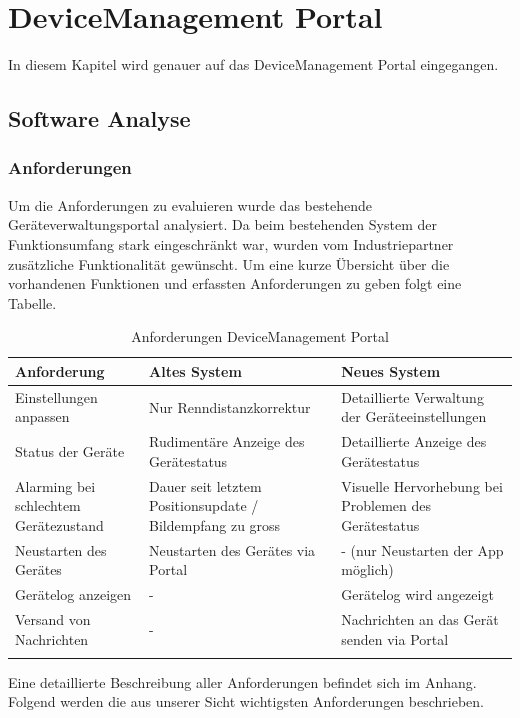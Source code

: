 \chapter{DeviceManagement Portal}

In diesem Kapitel wird genauer auf das DeviceManagement Portal eingegangen.

\section{Software Analyse}

\subsection{Anforderungen}
Um die Anforderungen zu evaluieren wurde das bestehende Geräteverwaltungsportal analysiert. Da beim bestehenden System der Funktionsumfang stark eingeschränkt war, wurden vom Industriepartner zusätzliche Funktionalität gewünscht.
Um eine kurze Übersicht über die vorhandenen Funktionen und erfassten Anforderungen zu geben folgt  eine Tabelle.

{\renewcommand{\arraystretch}{2}%
    \begin{longtable}{  p{3.5cm} | p{4.3cm} | p{4.3cm} }

    \textbf{Anforderung} & \textbf{Altes System} & \textbf{Neues System} \\ \hline
\hline
    Einstellungen anpassen & Nur Renndistanzkorrektur & Detaillierte Verwaltung der Geräteeinstellungen \\ \hline
    Status der Geräte & Rudimentäre Anzeige des Gerätestatus & Detaillierte Anzeige des Gerätestatus \\
    \hline
     Alarming bei schlechtem Gerätezustand & Dauer seit letztem Positionsupdate / Bildempfang zu gross & Visuelle Hervorhebung bei Problemen des Gerätestatus \\
    \hline
    Neustarten des Gerätes & Neustarten des Gerätes via Portal & - (nur Neustarten der App möglich)\\
    \hline
    Gerätelog anzeigen & - & Gerätelog wird angezeigt\\
    \hline
    Versand von Nachrichten & - & Nachrichten an das Gerät senden via Portal\\

\caption{Anforderungen DeviceManagement Portal}
\end{longtable}}

Eine detaillierte Beschreibung aller Anforderungen befindet sich im Anhang. Folgend werden die aus unserer Sicht wichtigsten Anforderungen beschrieben.

